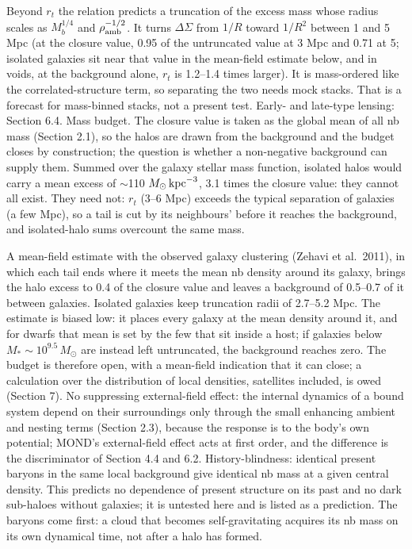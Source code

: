 \documentclass[
  10pt,
]{article}
\begin{document}
Beyond $r_t$ the relation predicts a truncation of the excess mass whose radius scales as $M_b^{1/4}$ and $\rho_{\rm amb}^{-1/2}$. It turns $\Delta\Sigma$ from $1/R$ toward $1/R^2$ between 1 and 5 Mpc (at the closure value, 0.95 of the untruncated value at 3 Mpc and 0.71 at 5; isolated galaxies sit near that value in the mean-field estimate below, and in voids, at the background alone, $r_t$ is 1.2--1.4 times larger). It is mass-ordered like the correlated-structure term, so separating the two needs mock stacks. That is a forecast for mass-binned stacks, not a present test. Early- and late-type lensing: Section 6.4. Mass budget. The closure value is taken as the global mean of all nb mass (Section 2.1), so the halos are drawn from the background and the budget closes by construction; the question is whether a non-negative background can supply them. Summed over the galaxy stellar mass function, isolated halos would carry a mean excess of $\sim$110 $M_\odot\,{\rm kpc}^{-3}$, 3.1 times the closure value: they cannot all exist. They need not: $r_t$ (3--6 Mpc) exceeds the typical separation of galaxies (a few Mpc), so a tail is cut by its neighbours' before it reaches the background, and isolated-halo sums overcount the same mass.

A mean-field estimate with the observed galaxy clustering (Zehavi et al.~2011), in which each tail ends where it meets the mean nb density around its galaxy, brings the halo excess to 0.4 of the closure value and leaves a background of 0.5--0.7 of it between galaxies. Isolated galaxies keep truncation radii of 2.7--5.2 Mpc. The estimate is biased low: it places every galaxy at the mean density around it, and for dwarfs that mean is set by the few that sit inside a host; if galaxies below $M_*\sim10^{9.5}\,M_\odot$ are instead left untruncated, the background reaches zero. The budget is therefore open, with a mean-field indication that it can close; a calculation over the distribution of local densities, satellites included, is owed (Section 7). No suppressing external-field effect: the internal dynamics of a bound system depend on their surroundings only through the small enhancing ambient and nesting terms (Section 2.3), because the response is to the body's own potential; MOND's external-field effect acts at first order, and the difference is the discriminator of Section 4.4 and 6.2. History-blindness: identical present baryons in the same local background give identical nb mass at a given central density. This predicts no dependence of present structure on its past and no dark sub-haloes without galaxies; it is untested here and is listed as a prediction. The baryons come first: a cloud that becomes self-gravitating acquires its nb mass on its own dynamical time, not after a halo has formed.
\end{document}
